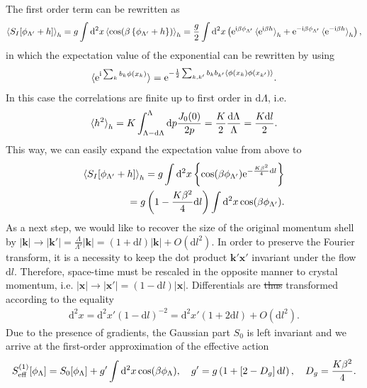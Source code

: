 \documentclass{svmono}
\def\ri{\mathrm i}
\def\re{\mathrm e}
\def\rd{\mathrm d}
\newcommand{\commutator}[1]{\left[ #1 \right]}
\newcommand{\anticommutator}[1]{\left\{ #1 \right\}}
\newcommand{\brlr}[1]{\left( #1 \right)}
\providecommand{\DIFdeltex}[1]{{\protect\color{red}\sout{#1}}}                      %
\providecommand{\DIFdelbegin}{} %
\providecommand{\DIFdelend}{} %
\providecommand{\DIFdel}[1]{\texorpdfstring{\DIFdeltex{#1}}{}} %
\newcommand{\DIFscaledelfig}{0.5}
\newlength{\DIFdelgraphicswidth} %
\newlength{\DIFdelgraphicsheight} %
\newcommand{\DIFdelincludegraphics}[2][]{%
\sbox{\DIFdelgraphicsbox}{\DIFOincludegraphics[#1]{#2}}%
\settoboxwidth{\DIFdelgraphicswidth}{\DIFdelgraphicsbox} %
\settoboxtotalheight{\DIFdelgraphicsheight}{\DIFdelgraphicsbox} %
\scalebox{\DIFscaledelfig}{%
\parbox[b]{\DIFdelgraphicswidth}{\usebox{\DIFdelgraphicsbox}\\[-\baselineskip] \rule{\DIFdelgraphicswidth}{0em}}\llap{\resizebox{\DIFdelgraphicswidth}{\DIFdelgraphicsheight}{%
\setlength{\unitlength}{\DIFdelgraphicswidth}%
\begin{picture}(1,1)%
\thicklines\linethickness{2pt} %
{\color[rgb]{1,0,0}\put(0,0){\framebox(1,1){}}}%
{\color[rgb]{1,0,0}\put(0,0){\line( 1,1){1}}}%
{\color[rgb]{1,0,0}\put(0,1){\line(1,-1){1}}}%
\end{picture}%
}\hspace*{3pt}}} %
} %
\DeclareRobustCommand{\DIFdelbegin}{\DIFOdelbegin \let\includegraphics\DIFdelincludegraphics} %
\DeclareRobustCommand{\DIFdelend}{\DIFOaddend \let\includegraphics\DIFOincludegraphics} %
\begin{document}
The first order term can be rewritten as
\begin{align}
    \braket{S_I[\phi_{\Lambda'}+h]}_h = g\int\rd^2x\braket{\cos(\beta\anticommutator{\phi_{\Lambda'}+h})}_h
    = \frac g2\int\rd^2x\brlr{\re^{\ri\beta \phi_{\Lambda'}}\braket{\re^{\ri\beta h}}_h+\re^{-\ri\beta \phi_{\Lambda'}}\braket{\re^{-\ri\beta h}}_h},
\end{align}
in which the expectation value of the exponential can be rewritten by using
\begin{align}
    \braket{\re^{\ri\sum_kb_k\phi(x_k)}} = \re^{-\frac12\sum_{k,k'}b_kb_{k'}\braket{\phi(x_k)\phi(x_{k'})}}.
    \label{eq:expectation_value_exponential_fields}
\end{align}
In this case the correlations are finite up to first order in $\rd\Lambda$, i.e.
\begin{align}
    \braket{h^2}_h = K\int_{\Lambda-\rd\Lambda}^\Lambda\rd p\frac{J_0(0)}{2p} = \frac K2\frac{\rd\Lambda}\Lambda = \frac{K\rd l}2.
    \label{eq:rg_hsq}
\end{align}
This way, we can easily expand the expectation value from above to
\begin{align}
    \braket{S_I[\phi_{\Lambda'}+h]}_h
    = g\int\rd^2x\anticommutator{\cos(\beta \phi_{\Lambda'})\re^{-\frac{K\beta^2}4\rd l}}
    \\
    = g\brlr{1 - \frac{K\beta^2}4\rd l}\int\rd^2x\cos(\beta \phi_{\Lambda'}).
\end{align}
As a next step, we would like to recover the size of the original momentum shell by $|{\bm k}|\rightarrow |{\bm k}'|=\frac{\Lambda}{\Lambda'}|{\bm k}| = (1+\rd l)|{\bm k}|+O(\rd l^2)$.
In order to preserve the Fourier transform, it is a necessity to keep the dot product ${\bm k'}{\bm x'}$ invariant under the flow $\rd l$.
Therefore, space-time must be rescaled in the opposite manner to crystal momentum, i.e. $|{\bm x}|\rightarrow|{\bm x'}|=(1-\rd l)|{\bm x}|$.
Differentials are \DIFdelbegin \DIFdel{thus }\DIFdelend transformed according to the equality
\begin{align}
    \rd^2x = \rd^2 x'(1-\rd l)^{-2} = \rd^2 x'(1+2\rd l) + O(\rd l^2).
\end{align}
Due to the presence of gradients, the Gaussian part $S_0$ is left invariant and we arrive at the first-order approximation of the effective action
\begin{align}
    S^{(1)}_{\rm eff}[\phi_\Lambda]=S_0[\phi_\Lambda] + g'\int\rd^2x\cos(\beta \phi_{\Lambda}),
    \quad
    g' = g\brlr{1 + \commutator{2-D_g}\rd l},
    \quad
    D_g=\frac{K\beta^2}4.
    \label{eq:bkt_first_order}
\end{align}
\end{document}
